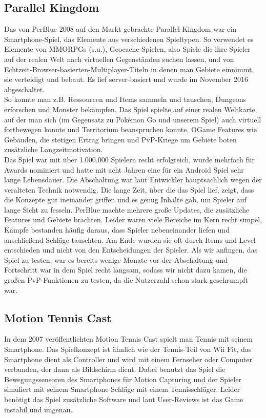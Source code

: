 \documentclass[extern,palatino]{cgBA}
\begin{document}
	\subsection{Parallel Kingdom}
	Das von PerBlue 2008 auf den Markt gebrachte Parallel Kingdom war ein Smartphone-Spiel, das Elemente aus verschiedenen Spieltypen. So verwendet es Elemente von MMORPGs (s.u.), Geocache-Spielen, also Spiele die ihre Spieler auf der realen Welt nach virtuellen Gegenständen suchen lassen, und von Echtzeit-Browser-basierten-Multiplayer-Titeln in denen man Gebiete einnimmt, sie verteidigt und bebaut. Es lief server-basiert und wurde im November 2016 abgeschaltet. %
	\\So konnte man z.B. Ressourcen und Items sammeln und tauschen, Dungeons erforschen und Monster bekämpfen. Das Spiel spielte  auf einer realen Weltkarte, auf der man sich (im Gegensatz zu Pokémon Go und unserem Spiel) auch virtuell fortbewegen konnte und Territorium beanspruchen konnte. OGame Features wie Gebäuden, die stetigen Ertrag bringen und PvP-Kriege um Gebiete boten zusätzliche Langzeitmotivation.
	\\Das Spiel war mit über 1.000.000 Spielern recht erfolgreich, wurde mehrfach für Awards nominiert und hatte mit acht Jahren eine für ein Android Spiel sehr lange Lebensdauer.  %
	Die Abschaltung war laut Entwickler hauptsächlich wegen der veralteten Technik notwendig. %
	Die lange Zeit, über die das Spiel lief, zeigt, dass die Konzepte gut ineinander griffen und es genug Inhalte gab, um Spieler auf lange Sicht zu fesseln. PerBlue machte mehrere große Updates, die zusätzliche Features und Gebiete brachten. Leider waren viele Bereiche im Kern recht simpel, Kämpfe bestanden häufig daraus, dass Spieler nebeneinander liefen und anschließend Schläge tauschten. Am Ende wurden sie oft durch Items und Level entschieden und nicht von den Entscheidungen der Spieler. Als wir anfingen, das Spiel zu testen, war es bereits wenige Monate vor der Abschaltung und Fortschritt war in dem Spiel recht langsam, sodass wir nicht dazu kamen, die großen PvP-Funktionen zu testen, da die Nutzerzahl schon stark geschrumpft war.
	\subsection{Motion Tennis Cast}
	In dem 2007 veröffentlichten Motion Tennis Cast spielt man Tennis mit seinem Smartphone. Das Spielkonzept ist ähnlich wie der Tennis-Teil von Wii Fit, das Smartphone dient als Controller und wird mit einem Fernseher oder Computer verbunden, der dann als Bildschirm dient. Dabei benutzt das Spiel die Bewegungssensoren des Smartphones für Motion Capturing und der Spieler simuliert mit seinem Smartphone Schläge mit einem Tennisschläger. Leider benötigt das Spiel zusätzliche Software und laut User-Reviews ist das Game instabil und ungenau.
	\newpage
	
\end{document}
